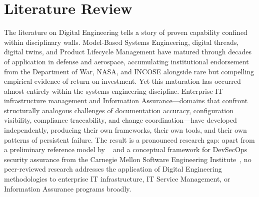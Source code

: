 \chapter{\leavevmode\newline Literature Review}\label{chap:chapter_2}



The literature on Digital Engineering tells a story of proven capability confined within disciplinary walls. Model-Based Systems Engineering, digital threads, digital twins, and Product Lifecycle Management have matured through decades of application in defense and aerospace, accumulating institutional endorsement from the Department of War, NASA, and INCOSE alongside rare but compelling empirical evidence of return on investment. Yet this maturation has occurred almost entirely within the systems engineering discipline. Enterprise IT infrastructure management and Information Assurance---domains that confront structurally analogous challenges of documentation accuracy, configuration visibility, compliance traceability, and change coordination---have developed independently, producing their own frameworks, their own tools, and their own patterns of persistent failure. The result is a pronounced research gap: apart from a preliminary reference model by \citeauthor{Bonar_Hastings_2024}~\parencite{Bonar_Hastings_2024} and a conceptual framework for DevSecOps security assurance from the Carnegie Mellon Software Engineering Institute~\parencite{CMU_SEI_DevSecOps_2023}, no peer-reviewed research addresses the application of Digital Engineering methodologies to enterprise IT infrastructure, IT Service Management, or Information Assurance programs broadly.

